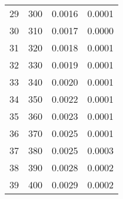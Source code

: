 \begin{table}[H]
\begin{tabular}{cccc}
\cline{1-4}
29 & 300 & 0.0016 & 0.0001 \\
\cline{1-4}
30 & 310 & 0.0017 & 0.0000 \\
\cline{1-4}
31 & 320 & 0.0018 & 0.0001 \\
\cline{1-4}
32 & 330 & 0.0019 & 0.0001 \\
\cline{1-4}
33 & 340 & 0.0020 & 0.0001 \\
\cline{1-4}
34 & 350 & 0.0022 & 0.0001 \\
\cline{1-4}
35 & 360 & 0.0023 & 0.0001 \\
\cline{1-4}
36 & 370 & 0.0025 & 0.0001 \\
\cline{1-4}
37 & 380 & 0.0025 & 0.0003 \\
\cline{1-4}
38 & 390 & 0.0028 & 0.0002 \\
\cline{1-4}
39 & 400 & 0.0029 & 0.0002 \\
\cline{1-4}
\end{tabular}
\end{table}

